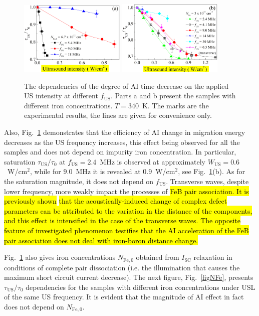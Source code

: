 \documentclass[sn-mathphys]{sn-jnl}%
\theoremstyle{thmstyleone}%
\theoremstyle{thmstyletwo}%
\theoremstyle{thmstylethree}%
\begin{document}
\begin{figure}
\centering
 \includegraphics[width=0.45\textwidth]{Fig4a}
 \includegraphics[width=0.45\textwidth]{Fig4b}
\caption{
The dependencies of the degree of AI time decrease on the applied US intensity at different $f_\mathrm{US}$.
Parts a and b present the samples with different iron concentrations.
$T=340$~K.
The marks are the experimental results, the lines are given for convenience only.
}
\label{figfus}       %
\end{figure}

Also, Fig.~\ref{figfus} demonstrates that the efficiency of
AI change in migration energy decreases as the US frequency increases,
this effect being observed for all the samples and does not depend on impurity iron concentration.
In particular, saturation $\tau_\mathrm{US}/\tau_{0}$ at $f_\mathrm{US}=2.4$~MHz is observed
at approximately $W_\mathrm{US}=0.6$~W/cm$^2$,
while for $9.0$~MHz it is revealed at $0.9$~W/cm$^2$, see Fig.~\ref{figfus}(b).
As for the saturation magnitude, it does not depend on $f_\mathrm{US}$.
Transverse waves, despite lower frequency, more weakly impact the processes of \hl{FeB pair association.
It is previously shown} \cite{Olikh2018SM} \hl{that the acoustically-induced change of complex defect parameters can be attributed to the variation in the distance of the components, and this effect is intensified in the case of the transverse waves.
The opposite feature of investigated phenomenon testifies that the AI acceleration of the FeB pair
association does not deal with iron-boron distance change.}

Fig.~\ref{figfus} also gives iron concentrations $N_\mathrm{Fe,0}$ obtained from $I_\mathrm{SC}$ relaxation
in conditions of complete pair dissociation (i.e. the illumination that causes the maximum short circuit current decrease).
The next figure, Fig.~\ref{figNFe}, presents $\tau_\mathrm{US}/\tau_{0}$  dependencies
for the samples with different iron concentrations under USL of the same US frequency.
It is evident that the magnitude of AI effect in fact does not depend on $N_\mathrm{Fe,0}$.
\end{document}
